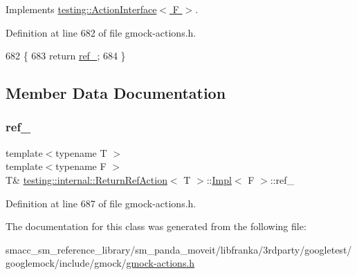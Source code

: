 Implements \hyperlink{classtesting_1_1ActionInterface_a20f8624fcea1786f2992b358760422a0}{testing\+::\+Action\+Interface$<$ F $>$}.



Definition at line 682 of file gmock-\/actions.\+h.


\begin{DoxyCode}
682                                                  \{
683       \textcolor{keywordflow}{return} \hyperlink{classtesting_1_1internal_1_1ReturnRefAction_1_1Impl_a647d8e360f3e2d2f4da89f7f348b40dd}{ref\_};
684     \}
\end{DoxyCode}


\subsection{Member Data Documentation}
\mbox{\label{classtesting_1_1internal_1_1ReturnRefAction_1_1Impl_a647d8e360f3e2d2f4da89f7f348b40dd}} 
\subsubsection{\texorpdfstring{ref\+\_\+}{ref\_}}
{\footnotesize\ttfamily template$<$typename T $>$ \\
template$<$typename F $>$ \\
T\& \hyperlink{classtesting_1_1internal_1_1ReturnRefAction}{testing\+::internal\+::\+Return\+Ref\+Action}$<$ T $>$\+::\hyperlink{classtesting_1_1internal_1_1ReturnRefAction_1_1Impl}{Impl}$<$ F $>$\+::ref\+\_\+\hspace{0.3cm}{\ttfamily [private]}}



Definition at line 687 of file gmock-\/actions.\+h.



The documentation for this class was generated from the following file\+:\begin{DoxyCompactItemize}
\item 
smacc\+\_\+sm\+\_\+reference\+\_\+library/sm\+\_\+panda\+\_\+moveit/libfranka/3rdparty/googletest/googlemock/include/gmock/\hyperlink{gmock-actions_8h}{gmock-\/actions.\+h}\end{DoxyCompactItemize}
